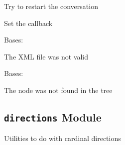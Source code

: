 \documentclass[letterpaper,10pt,english]{sphinxmanual}
\begin{document}
\begin{fulllineitems}

\begin{fulllineitems}
\label{blocks:serge.blocks.conversation.ConversationManager.restartConversation}
Try to restart the conversation

\end{fulllineitems}


\begin{fulllineitems}
\label{blocks:serge.blocks.conversation.ConversationManager.setCallback}
Set the callback

\end{fulllineitems}


\end{fulllineitems}


\begin{fulllineitems}
\label{blocks:serge.blocks.conversation.InvalidFile}
Bases: 

The XML file was not valid

\end{fulllineitems}


\begin{fulllineitems}
\label{blocks:serge.blocks.conversation.NodeNotFound}
Bases: 

The node was not found in the tree

\end{fulllineitems}



\subsection{\texttt{directions} Module}
\label{blocks:directions-module}\label{blocks:module-serge.blocks.directions}
Utilities to do with cardinal directions
\end{document}
